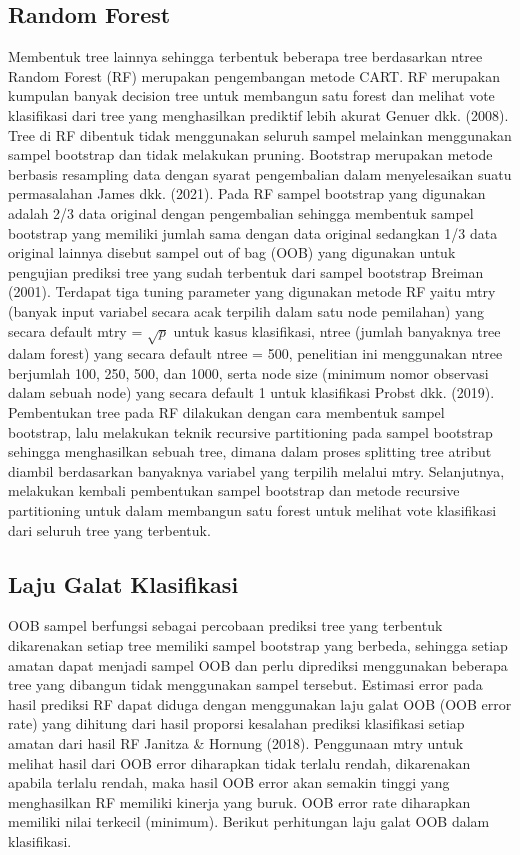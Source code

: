 \subsection{Random Forest}
Membentuk tree lainnya sehingga terbentuk beberapa tree berdasarkan ntree Random Forest (RF) merupakan pengembangan metode CART. RF merupakan kumpulan banyak decision tree untuk membangun satu forest dan melihat vote klasifikasi dari tree yang menghasilkan prediktif lebih akurat Genuer dkk. (2008). Tree di RF dibentuk tidak menggunakan seluruh sampel melainkan menggunakan sampel bootstrap dan tidak melakukan pruning. Bootstrap merupakan metode berbasis resampling data dengan syarat pengembalian dalam menyelesaikan suatu permasalahan James dkk. (2021). Pada RF sampel bootstrap yang digunakan adalah 2/3 data original dengan pengembalian sehingga membentuk sampel bootstrap yang memiliki jumlah sama dengan data original sedangkan 1/3 data original lainnya disebut sampel out of bag (OOB) yang digunakan untuk pengujian prediksi tree yang sudah terbentuk dari sampel bootstrap Breiman (2001).
Terdapat tiga tuning parameter yang digunakan metode RF yaitu mtry (banyak input variabel secara acak terpilih dalam satu node pemilahan) yang secara default mtry = $\sqrt{p}$ untuk kasus klasifikasi, ntree (jumlah banyaknya tree dalam forest) yang secara default ntree = 500, penelitian ini menggunakan ntree berjumlah 100, 250, 500, dan 1000, serta node size (minimum nomor observasi dalam sebuah node) yang secara default 1 untuk klasifikasi Probst dkk. (2019). Pembentukan tree pada RF dilakukan dengan cara membentuk sampel bootstrap, lalu melakukan teknik recursive partitioning pada sampel bootstrap sehingga menghasilkan sebuah tree, dimana dalam proses splitting tree atribut diambil berdasarkan banyaknya variabel yang terpilih melalui mtry. Selanjutnya, melakukan kembali pembentukan sampel bootstrap dan metode recursive partitioning untuk dalam membangun satu forest untuk melihat vote klasifikasi dari seluruh tree yang terbentuk.

\subsection{Laju Galat Klasifikasi}
OOB sampel berfungsi sebagai percobaan prediksi tree yang terbentuk dikarenakan setiap tree memiliki sampel bootstrap yang berbeda, sehingga setiap amatan dapat menjadi sampel OOB dan perlu diprediksi menggunakan beberapa tree yang dibangun tidak menggunakan sampel tersebut. Estimasi error pada hasil prediksi RF dapat diduga dengan menggunakan laju galat OOB (OOB error rate) yang dihitung dari hasil proporsi kesalahan prediksi klasifikasi setiap amatan dari hasil RF Janitza \& Hornung (2018). Penggunaan mtry untuk melihat hasil dari OOB error diharapkan tidak terlalu rendah, dikarenakan apabila terlalu rendah, maka hasil OOB error akan semakin tinggi yang menghasilkan RF memiliki kinerja yang buruk. OOB error rate diharapkan memiliki nilai terkecil (minimum). Berikut perhitungan laju galat OOB dalam klasifikasi.

